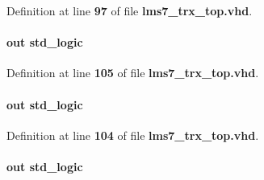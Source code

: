 Definition at line {\bf 97} of file {\bf lms7\+\_\+trx\+\_\+top.\+vhd}.

\paragraph[{F\+X3\+\_\+\+C\+T\+L11}]{ {\bfseries \textcolor{keywordflow}{out}\textcolor{vhdlchar}{ }} {\bfseries \textcolor{comment}{std\+\_\+logic}\textcolor{vhdlchar}{ }} \hspace{0.3cm}{\ttfamily [Port]}}\label{classlms7__trx__top_a803cd49320db36bbb2341bb8e76fe935}


Definition at line {\bf 105} of file {\bf lms7\+\_\+trx\+\_\+top.\+vhd}.

\paragraph[{F\+X3\+\_\+\+C\+T\+L12}]{ {\bfseries \textcolor{keywordflow}{out}\textcolor{vhdlchar}{ }} {\bfseries \textcolor{comment}{std\+\_\+logic}\textcolor{vhdlchar}{ }} \hspace{0.3cm}{\ttfamily [Port]}}\label{classlms7__trx__top_ab0afa7961bc888fa27ff585133fcdbd0}


Definition at line {\bf 104} of file {\bf lms7\+\_\+trx\+\_\+top.\+vhd}.

\paragraph[{F\+X3\+\_\+\+C\+T\+L2}]{ {\bfseries \textcolor{keywordflow}{out}\textcolor{vhdlchar}{ }} {\bfseries \textcolor{comment}{std\+\_\+logic}\textcolor{vhdlchar}{ }} \hspace{0.3cm}{\ttfamily [Port]}}\label{classlms7__trx__top_aec99ffc7d4233f86f8bd991bcdbf7183}


